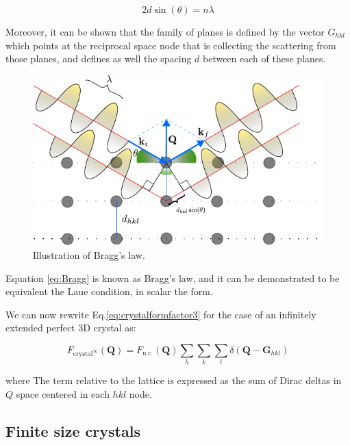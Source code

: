 \begin{equation}
    2 d \sin(\theta) = n \lambda 
   \label{eq:Bragg}
\end{equation}

Moreover, it can be shown that the family of planes is defined by the vector $G_{hkl}$ which points at the reciprocal space 
node that is collecting the scattering from those planes, and defines as well the spacing $d$ between each of these planes. 

\begin{figure}[H]
    \centering
    \includegraphics[width=\textwidth]{figures/Intro/bragg.pdf}
    \caption{Illustration of Bragg's law.}
    \label{fig:bragg}
\end{figure}

Equation \ref{eq:Bragg} is known as Bragg's law, and it can be demonstrated to be equivalent the Laue condition, in scalar the form. 

We can now rewrite Eq.\ref{eq:crystalformfactor3} for the case of an infinitely extended perfect 3D crystal as: 

\begin{equation}
    F_{\text{crystal}^{\infty}}(\mathbf{Q}) = F_{\text{u.c.}}(\mathbf{Q}) 
    \sum_{h} \sum_{k} \sum_{l} 
    \delta\!\left(\mathbf Q - \mathbf{G}_{hkl}\right)
    \label{eq:crystalformfactor4}
\end{equation}
    
where The term relative to the lattice is expressed as the sum of Dirac deltas in $Q$ space centered in each $hkl$ node. 


\subsection{Finite size crystals}

